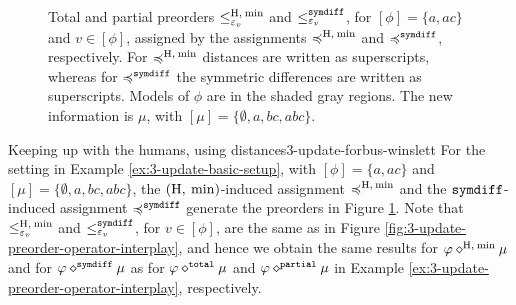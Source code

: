\begin{figure}
	\caption{
		Total and partial preorders 
		$\le^{{\operatorname{H}},\:{\operatorname{min}}}_{\varepsilon_{v}}$ 
		and
		$\le^{\mathtt{symdiff}}_{\varepsilon_{v}}$,
		for $[\phi]=\{a,ac\}$
		and $v\in[\phi]$,
		assigned by the assignments $\preccurlyeq^{{\operatorname{H}},\:{\operatorname{min}}}$
		and $\preccurlyeq^{\mathtt{symdiff}}$,
		respectively.
		For $\preccurlyeq^{{\operatorname{H}},\:{\operatorname{min}}}$ distances are written as superscripts,
		whereas for $\preccurlyeq^{\mathtt{symdiff}}$ the symmetric differences 
		are written as superscripts. 
		Models of $\phi$ are in the shaded gray regions.
		The new information is $\mu$,
		with $[\mu]=\{\emptyset,a,bc,abc\}$.
	}
	\label{fig:3-update-forbus-winslett}
\end{figure}	


\begin{xmpl}{Keeping up with the humans, using distances}{3-update-forbus-winslett}
	For the setting in Example \ref{ex:3-update-basic-setup},
	with 
	$[\phi]=\{a,ac\}$ and $[\mu]=\{\emptyset,a,bc,abc\}$,
	the $({\operatorname{H}},\:{\operatorname{min}})$-induced assignment $\preccurlyeq^{{\operatorname{H}},\:{\operatorname{min}}}$
	and the $\mathtt{symdiff}$-induced assignment $\preccurlyeq^{\mathtt{symdiff}}$
	generate the preorders in Figure \ref{fig:3-update-forbus-winslett}.
	Note that $\le^{{\operatorname{H}},\:{\operatorname{min}}}_{\varepsilon_{v}}$ 
	and 
	$\le^{\mathtt{symdiff}}_{\varepsilon_{v}}$,
	for $v\in[\phi]$,
	are the same as in Figure \ref{fig:3-update-preorder-operator-interplay},
	and hence we obtain the same results for $\varphi\diamond^{{\operatorname{H}},\:{\operatorname{min}}}\mu$
	and for $\varphi\diamond^{\mathtt{symdiff}}\mu$
	as for $\varphi \diamond^{\mathtt{total}}\mu$ and $\varphi\diamond^{\mathtt{partial}}\mu$
	in Example \ref{ex:3-update-preorder-operator-interplay},
	respectively.
\end{xmpl}


